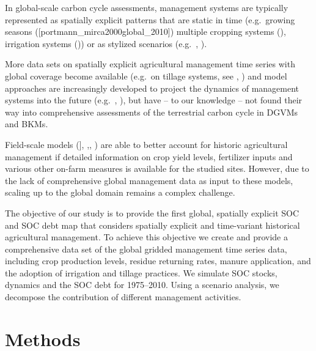 \documentclass[gc, manuscript]{copernicus}
\begin{document}
In global-scale carbon cycle assessments, management systems are typically represented as spatially explicit patterns that are static in time (e.g.~growing seasons ({[}portmann\_mirca2000global\_2010{]}) multiple cropping systems (\citep{waha_multiple_2020}), irrigation systems (\citep{jagermeyr_water_2015})) or as stylized scenarios (e.g.~\citep{pugh_simulated_2015}, \citep{lutz_simulating_2019}).

More data sets on spatially explicit agricultural management time series with global coverage become available (e.g.~on tillage systems, see \citep{porwollik_generating_2018}, \citep{prestele_spatially_2018}) and model approaches are increasingly developed to project the dynamics of management systems into the future (e.g.~\citep{iizumi_modeling_2019}, \citep{minoli_modelling_2019}), but have -- to our knowledge -- not found their way into comprehensive assessments of the terrestrial carbon cycle in DGVMs and BKMs.

Field-scale models (\citet{del_grosso_simulated_2001}{]}, \citep{coleman_simulating_1997},\citep{smith_estimating_2010}, \citep{taghizadeh-toosi_c-tool_2014}) are able to better account for historic agricultural management if detailed information on crop yield levels, fertilizer inputs and various other on-farm measures is available for the studied sites. However, due to the lack of comprehensive global management data as input to these models, scaling up to the global domain remains a complex challenge.

The objective of our study is to provide the first global, spatially explicit SOC and SOC debt map that considers spatially explicit and time-variant historical agricultural management. To achieve this objective we create and provide a comprehensive data set of the global gridded management time series data, including crop production levels, residue returning rates, manure application, and the adoption of irrigation and tillage practices. We simulate SOC stocks, dynamics and the SOC debt for 1975--2010. Using a scenario analysis, we decompose the contribution of different management activities.
\newpage

\hypertarget{methods}{%
\section{Methods}\label{methods}}
\end{document}
